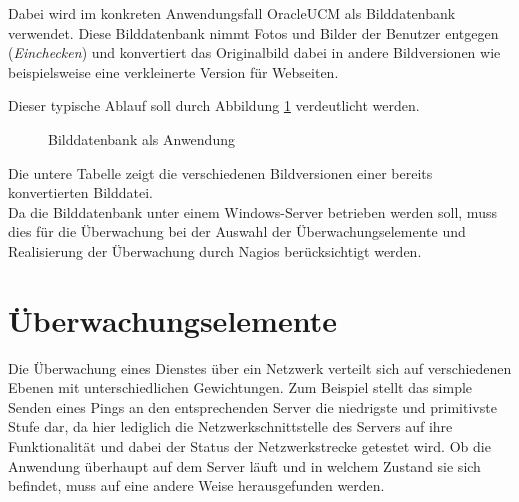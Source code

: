 Dabei wird im konkreten Anwendungsfall \gls{OracleUCM} als Bilddatenbank verwendet.
Diese Bilddatenbank nimmt Fotos und Bilder der Benutzer entgegen (\textit{Einchecken}) und konvertiert das Originalbild dabei in andere Bildversionen wie beispielsweise eine verkleinerte Version für Webseiten.

Dieser typische Ablauf soll durch Abbildung \ref{bdbanw} verdeutlicht werden.
\begin{figure}[ht]
	\centering
		\caption{Bilddatenbank als Anwendung}
		\label{bdbanw}
\end{figure}

Die untere Tabelle zeigt die verschiedenen Bildversionen einer bereits konvertierten Bilddatei.\\

Da die Bilddatenbank unter einem Windows-Server betrieben werden soll, muss dies für die Überwachung bei der Auswahl der Überwachungselemente und Realisierung der Überwachung durch Nagios berücksichtigt werden.

\newpage
\section{Überwachungselemente}
\label{elemente}
Die Überwachung eines Dienstes über ein Netzwerk verteilt sich auf verschiedenen Ebenen mit unterschiedlichen Gewichtungen.
Zum Beispiel stellt das simple Senden eines Pings an den entsprechenden Server die niedrigste und primitivste Stufe dar, da hier lediglich die Netzwerkschnittstelle des Servers auf ihre Funktionalität und dabei der Status der Netzwerkstrecke getestet wird.
Ob die Anwendung überhaupt auf dem Server läuft und in welchem Zustand sie sich befindet, muss auf eine andere Weise herausgefunden werden.


